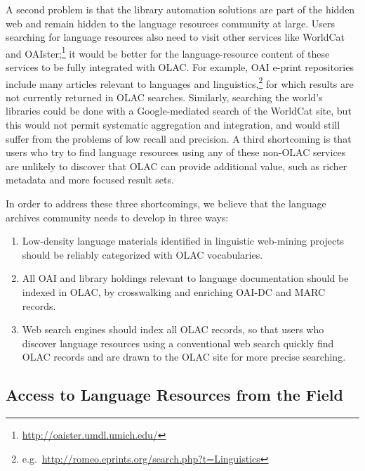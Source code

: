 A second problem is that the library automation solutions are part of
the hidden web and remain hidden to the language resources community
at large.
Users searching for language
resources also need to visit other services like WorldCat and OAIster;\footnote{\scriptsize\url{http://oaister.umdl.umich.edu/}}
it would be better for the language-resource content
of these services to be fully integrated with OLAC.
For example, OAI e-print repositories include many articles
relevant to languages and linguistics,\footnote{e.g.\ \small\url{http://romeo.eprints.org/search.php?t=Linguistics}}
for which results are not currently returned in OLAC searches.
Similarly, searching the world's libraries could be done with a
Google-mediated search of the WorldCat site, but this would not
permit systematic aggregation and integration, and would still suffer
from the problems of low recall and precision.
A third shortcoming is that users who try to find language resources
using any of these non-OLAC services are unlikely to discover that
OLAC can provide additional value, such as richer metadata and more
focused result sets.


In order to address these three shortcomings, we believe that the
language archives community needs to develop in three ways:

\begin{enumerate}\setlength{\itemsep}{0pt}
\item Low-density language materials identified in linguistic web-mining projects
      should be reliably categorized with OLAC vocabularies.
\item All OAI and library holdings relevant to language
      documentation should be indexed in OLAC, by
      crosswalking and enriching OAI-DC and MARC records.
\item Web search engines should index all OLAC records, so that
      users who discover language resources using a conventional 
      web search quickly find OLAC records and are drawn to the
      OLAC site for more precise searching.
\end{enumerate}

\subsection{Access to Language Resources from the Field}

